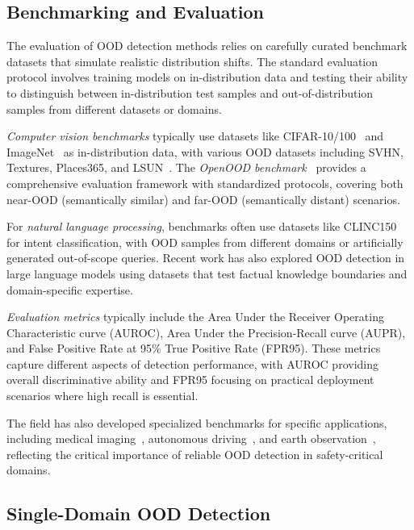 \documentclass[11pt, oneside]{book}
\theoremstyle{plain}
\theoremstyle{definition}
\theoremstyle{remark}
\begin{document}
\subsection{Benchmarking and Evaluation}

The evaluation of OOD detection methods relies on carefully curated benchmark datasets that simulate realistic distribution shifts. The standard evaluation protocol involves training models on in-distribution data and testing their ability to distinguish between in-distribution test samples and out-of-distribution samples from different datasets or domains.

\emph{Computer vision benchmarks} typically use datasets like CIFAR-10/100~\citep{cifar10} and ImageNet~\citep{ILSVRC15} as in-distribution data, with various OOD datasets including SVHN, Textures, Places365, and LSUN~\citep{yang2022openood}. The \emph{OpenOOD benchmark}~\citep{yang2022openood,zhang2023openood} provides a comprehensive evaluation framework with standardized protocols, covering both near-OOD (semantically similar) and far-OOD (semantically distant) scenarios.

For \emph{natural language processing}, benchmarks often use datasets like CLINC150 for intent classification, with OOD samples from different domains or artificially generated out-of-scope queries. Recent work has also explored OOD detection in large language models using datasets that test factual knowledge boundaries and domain-specific expertise.

\emph{Evaluation metrics} typically include the Area Under the Receiver Operating Characteristic curve (AUROC), Area Under the Precision-Recall curve (AUPR), and False Positive Rate at 95\% True Positive Rate (FPR95). These metrics capture different aspects of detection performance, with AUROC providing overall discriminative ability and FPR95 focusing on practical deployment scenarios where high recall is essential.

The field has also developed specialized benchmarks for specific applications, including medical imaging~\citep{zhang2021out}, autonomous driving~\citep{ramanagopal2018failing}, and earth observation~\citep{ekim2024distribution}, reflecting the critical importance of reliable OOD detection in safety-critical domains.

\subsection{Single-Domain OOD Detection}
\end{document}

